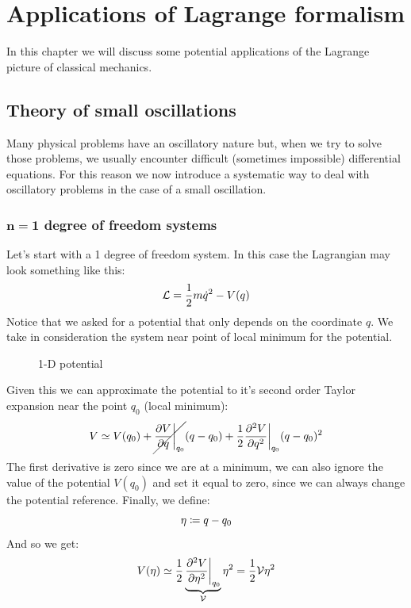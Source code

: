 \chapter{Applications of Lagrange formalism}
In this chapter we will discuss some potential applications of the Lagrange picture of classical mechanics.
\section{Theory of small oscillations}
Many physical problems have an oscillatory nature but, when we try to solve those problems, we usually encounter difficult (sometimes impossible) differential equations.
For this reason we now introduce a systematic way to deal with oscillatory problems in the case of a small oscillation.
\subsection{$\mathbf{n = 1}$ degree of freedom systems}
Let's start with a 1 degree of freedom system. In this case the Lagrangian may look something like this:
\begin{equation}
    \mathcal{L} = \dfrac{1}{2}m\dot{q}^2 - V(q)
\end{equation}
Notice that we asked for a potential that only depends on the coordinate $q$.
We take in consideration the system near point of local minimum for the potential.
\begin{figure}[!ht]
    \centering
    
    \caption{1-D potential}
    \label{fig:image10}
\end{figure}
Given this we can approximate the potential to it's second order Taylor expansion near the point $q_0$ (local minimum):
\begin{equation}
    V \simeq V(q_0) + \cancel{\pdv{V}{q}\bigg|_{q_0}}(q-q_0) + \dfrac{1}{2}\pdv[2]{V}{q}\bigg|_{q_0}(q-q_0)^2
\end{equation}
The first derivative is zero since we are at a minimum, we can also ignore the value of the potential $V(q_0)$ and set it equal to zero, since we can always change the potential reference. Finally, we define:
\begin{equation}
    \eta \coloneqq q-q_0
\end{equation}
And so we get:
\begin{equation} \label{e:potential_1D_oscillation}
    V(\eta) \simeq \dfrac{1}{2}\underbrace{\pdv[2]{V}{\eta}\bigg|_{q_0}}_{\Velegant}\eta^2 = \dfrac{1}{2}\Velegant\eta^2
\end{equation}
